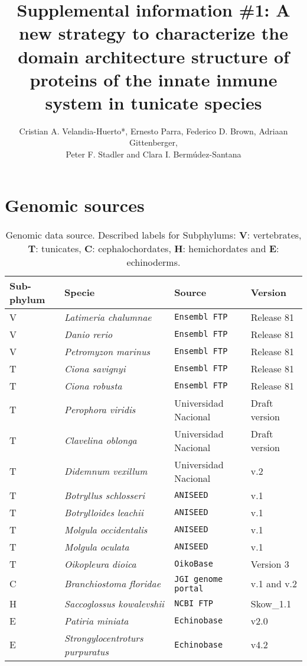\documentclass[12pt]{article}
\title{Supplemental information \#1: A new strategy to characterize the domain 
architecture structure of proteins of the innate inmune system in tunicate 
species}
\author{Cristian A. Velandia-Huerto*, Ernesto Parra, Federico D. 
Brown, Adriaan Gittenberger, \\ Peter F. Stadler and Clara I. 
Berm\'{u}dez-Santana}
\begin{document}
\maketitle

\section*{Genomic sources}
\begin{table}[ht!]
\centering
\begin{tabular}{p{2cm}p{5.6cm}p{5.5cm}l}
\toprule
\textbf{Sub-phylum} & \textbf{Specie} & \textbf{Source} & \textbf{Version} \\ 
\midrule
V & \textit{Latimeria chalumnae} & \texttt{Ensembl FTP}\footnotemark[1] & 
Release 81 \\
V & \textit{Danio rerio} & \texttt{Ensembl FTP}\footnotemark[2] & Release 81 \\
V & \textit{Petromyzon marinus} & \texttt{Ensembl FTP}\footnotemark[3] & 
Release 81 \\
\midrule
T & \textit{Ciona savignyi} & \texttt{Ensembl FTP}\footnotemark[4] & Release 81 
\\
T & \textit{Ciona robusta} & \texttt{Ensembl FTP}\footnotemark[5] & Release 81 
\\
T &\textsl{Perophora viridis} & Universidad Nacional\footnotemark[6] & Draft 
version \\ 
T &\textsl{Clavelina oblonga} & Universidad Nacional\footnotemark[7] & Draft 
version \\
T & \textit{Didemnum vexillum} & Universidad Nacional\footnotemark[8] & v.2 \\
T & \textit{Botryllus schlosseri} & \texttt{ANISEED}\footnotemark[9] & v.1 \\
T & \textit{Botrylloides leachii} & \texttt{ANISEED}\footnotemark[10] & v.1 \\
T &\textsl{Molgula occidentalis} & \texttt{ANISEED}\footnotemark[11] & v.1 \\
T &\textsl{Molgula oculata} & \texttt{ANISEED}\footnotemark[12] & v.1 \\
T & \textit{Oikopleura dioica} & \texttt{OikoBase}\footnotemark[13] & Version 3 
\\
\midrule
C & \textit{Branchiostoma floridae} & \texttt{JGI genome 
portal}\footnotemark[14] & v.1 and v.2 \\
\midrule
H & \textit{Saccoglossus kowalevshii} & \texttt{NCBI FTP}\footnotemark[15] & 
Skow\_1.1 \\
E & \textit{Patiria miniata} & \texttt{Echinobase}\footnotemark[16] & v2.0 \\
E & \textit{Strongylocentroturs purpuratus} & 
\texttt{Echinobase}\footnotemark[17] & v4.2 \\
\bottomrule
\end{tabular}
\caption{Genomic data source. Described labels for Subphylums: \textbf{V}: 
vertebrates,  \textbf{T}: tunicates, \textbf{C}: cephalochordates, \textbf{H}: 
hemichordates and \textbf{E}: echinoderms.}
\label{table:source}
\end{table}
\end{document}
